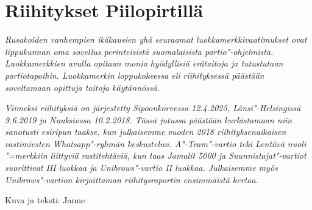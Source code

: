 \section{Riihitykset Piilopirtillä}

\textit{Rusakoiden vanhempien ikäkausien yhä seuraamat 
luokkamerkkivaatimukset ovat lippukunnan oma sovellus perinteisistä 
suomalaisista partio"-ohjelmista. Luokkamerkkien avulla opitaan monia 
hyödyllisiä erätaitoja ja tutustutaan partiotapoihin. Luokkamerkin 
loppukokeessa eli riihityksessä päästään soveltamaan opittuja taitoja 
käytännössä.}

\textit{Viimeksi riihityksiä on järjestetty Sipoonkorvessa 12.4.2025, 
Länsi"-Helsingissä 9.6.2019 ja Nuuksiossa 10.2.2018. Tässä jutussa 
päästään kurkistamaan niin sanotusti esiripun taakse, kun julkaisemme 
vuoden 2018 riihityksenaikaisen rastimiesten Whatsapp"-ryhmän keskustelun. 
A"-Team"-vartio teki Lentävä nuoli "=merkkiin liittyviä rastitehtäviä, kun 
taas Jamalit 5000 ja Suunnistajat"-vartiot suorittivat III luokkaa ja 
Unibrows"-vartio II luokkaa. Julkaisemme myös Unibrows"-vartion kirjoittaman 
riihitysraportin ensimmäistä kertaa.}

\medskip

\noindent\null\hfill Kuva ja teksti: Janne

